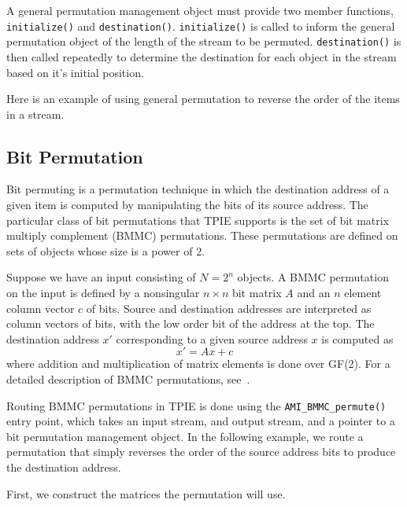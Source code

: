 A general permutation management object must provide two member
functions, \lstinline|initialize()| and \lstinline|destination()|.
\lstinline|initialize()| is called to inform the general permutation object
of the length of the stream to be permuted.  \lstinline|destination()| is
then called repeatedly to determine the destination for each object in
the stream based on it's initial position.

Here is an example of using general permutation to reverse the order
of the items in a stream.



\subsection{Bit Permutation}


Bit permuting is a permutation technique in which the destination address
of a given item is computed by manipulating the bits of its source address.
The particular class of bit permutations that TPIE supports is the set of
bit matrix multiply complement (BMMC) permutations.  These permutations are
defined on sets of objects whose size is a power of 2.

Suppose we have an input consisting of $N = 2^n$ objects.  A BMMC
permutation on the input is defined by a nonsingular $n \times n$ bit
matrix $A$ and an $n$ element column vector $c$ of bits.  Source and
destination addresses are interpreted as column vectors of bits, with
the low order bit of the address at the top. The destination address
$x'$ corresponding to a given source address $x$ is computed as
$$x' = Ax + c$$
where addition and multiplication of matrix
elements is done over GF(2). For a detailed description of BMMC
permutations, see~\cite{cormen:integrate-tr}.

Routing BMMC permutations in TPIE is done using the
\lstinline|AMI_BMMC_permute()| entry point, which takes an input stream, and output stream, and a
pointer to a bit permutation management object. In the following example,
we route a permutation that simply reverses the order of the source address
bits to produce the destination address.

First, we construct the matrices the permutation will use.

